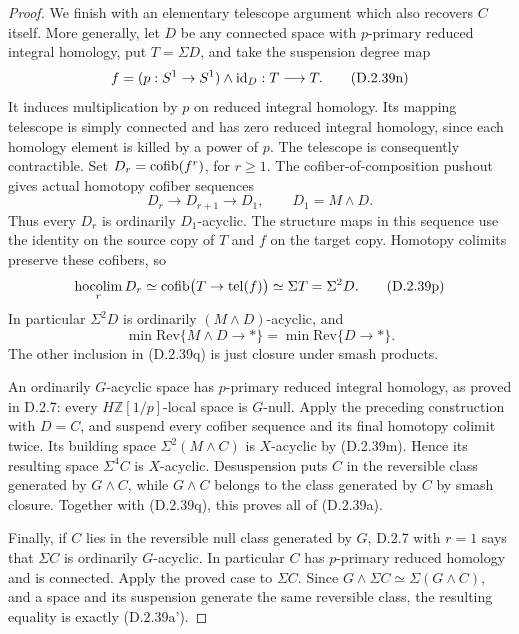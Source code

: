 \begin{proof}
We finish with an elementary telescope argument which also
recovers $C$ itself. More generally, let $D$ be any connected
space with $p$-primary reduced integral homology, put
$T=\Sigma D$, and take the suspension degree map
\[
 f=(p:S^1\to S^1)\wedge\mathrm{id}_D:T\longrightarrow T.
 \tag{D.2.39n}
\]
It induces multiplication by $p$ on reduced integral homology.
Its mapping telescope is simply connected and has zero reduced
integral homology, since each homology element is killed by a
power of $p$. The telescope is consequently contractible.
Set $D_r=\operatorname{cofib}(f^r)$, for $r\geq1$. The cofiber-of-composition
pushout gives actual homotopy cofiber sequences
\[
            D_r\longrightarrow D_{r+1}\longrightarrow D_1,
            \qquad D_1=M\wedge D.
 \tag{D.2.39o}
\]
Thus every $D_r$ is ordinarily $D_1$-acyclic. The structure
maps in this sequence use the identity on the source copy of
$T$ and $f$ on the target copy. Homotopy colimits preserve
these cofibers, so
\[
 \operatorname*{hocolim}_rD_r
     \simeq\operatorname{cofib}\bigl(T\to\operatorname{tel}(f)\bigr)
     \simeq\Sigma T=\Sigma^2D.
 \tag{D.2.39p}
\]
In particular $\Sigma^2D$ is ordinarily $(M\wedge D)$-acyclic,
and
\[
       \min\mathrm{Rev}\{M\wedge D\to *\}
                  =\min\mathrm{Rev}\{D\to *\}.
 \tag{D.2.39q}
\]
The other inclusion in \textup{(D.2.39q)} is just closure
under smash products.

An ordinarily $G$-acyclic space has $p$-primary reduced integral
homology, as proved in D.2.7: every $H\mathbb Z[1/p]$-local
space is $G$-null. Apply the preceding construction with
$D=C$, and suspend every cofiber sequence and its final
homotopy colimit twice. Its building space
$\Sigma^2(M\wedge C)$ is $X$-acyclic by
\textup{(D.2.39m)}. Hence its resulting space $\Sigma^4C$
is $X$-acyclic. Desuspension puts $C$ in the reversible
class generated by $G\wedge C$, while $G\wedge C$ belongs
to the class generated by $C$ by smash closure. Together
with \textup{(D.2.39q)}, this proves all of
\textup{(D.2.39a)}.

Finally, if $C$ lies in the reversible null class generated
by $G$, D.2.7 with $r=1$ says that $\Sigma C$ is ordinarily
$G$-acyclic. In particular $C$ has $p$-primary reduced
homology and is connected. Apply the proved case to
$\Sigma C$. Since $G\wedge\Sigma C\simeq\Sigma(G\wedge C)$,
and a space and its suspension generate the same reversible
class, the resulting equality is exactly
\textup{(D.2.39a')}.
\end{proof}
